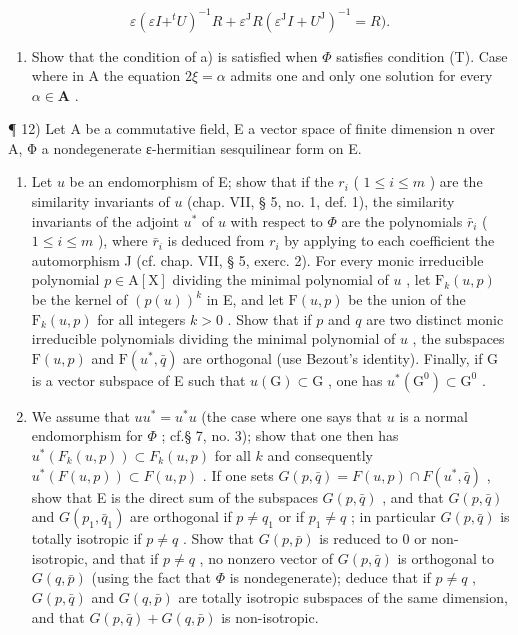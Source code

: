 \[
\varepsilon (\varepsilon I + ^ {t} U) ^ {- 1} R + \varepsilon^ {\mathrm{J}} R (\varepsilon^ {\mathrm{J}} I + U ^ {\mathrm{J}}) ^ {- 1} = R).
\]

\begin{enumerate}
\def\labelenumi{\alph{enumi})}
\setcounter{enumi}{1}
\tightlist
\item
  Show that the condition of a) is satisfied when \(\Phi\) satisfies condition (T). Case where in A the equation \(2\xi = \alpha\) admits one and only one solution for every \(\alpha \in \mathbf{A}\) .
\end{enumerate}

¶ 12) Let A be a commutative field, E a vector space of finite dimension n over A, Φ a nondegenerate ε-hermitian sesquilinear form on E.

\begin{enumerate}
\def\labelenumi{\alph{enumi})}
\item
  Let \(u\) be an endomorphism of E; show that if the \(r_i\) ( \(1 \leqslant i \leqslant m\) ) are the similarity invariants of \(u\) (chap. VII, § 5, no. 1, def. 1), the similarity invariants of the adjoint \(u^*\) of \(u\) with respect to \(\Phi\) are the polynomials \(\bar{r}_i\) ( \(1 \leqslant i \leqslant m\) ), where \(\bar{r}_i\) is deduced from \(r_i\) by applying to each coefficient the automorphism J (cf. chap. VII, § 5, exerc. 2). For every monic irreducible polynomial \(p \in \mathrm{A}[\mathrm{X}]\) dividing the minimal polynomial of \(u\) , let \(\mathrm{F}_k(u, p)\) be the kernel of \((p(u))^k\) in E, and let \(\mathrm{F}(u, p)\) be the union of the \(\mathrm{F}_k(u, p)\) for all integers \(k > 0\) . Show that if \(p\) and \(q\) are two distinct monic irreducible polynomials dividing the minimal polynomial of \(u\) , the subspaces \(\mathrm{F}(u, p)\) and \(\mathrm{F}(u^*, \bar{q})\) are orthogonal (use Bezout's identity). Finally, if G is a vector subspace of E such that \(u(\mathrm{G}) \subset \mathrm{G}\) , one has \(u^*(\mathrm{G}^0) \subset \mathrm{G}^0\) .
\item
  We assume that \(uu^{*} = u^{*}u\) (the case where one says that \(u\) is a normal endomorphism for \(\Phi\) ; cf.§ 7, no. 3); show that one then has \(u^{*}(F_{k}(u,p)) \subset F_{k}(u,p)\) for all \(k\) and consequently \(u^{*}(F(u,p)) \subset F(u,p)\) . If one sets \(G(p,\bar{q}) = F(u,p) \cap F(u^{*},\bar{q})\) , show that E is the direct sum of the subspaces \(G(p,\bar{q})\) , and that \(G(p,\bar{q})\) and \(G(p_{1},\bar{q}_{1})\) are orthogonal if \(p \neq q_{1}\) or if \(p_{1} \neq q\) ; in particular \(G(p,\bar{q})\) is totally isotropic if \(p \neq q\) . Show that \(G(p,\bar{p})\) is reduced to 0 or non-isotropic, and that if \(p \neq q\) , no nonzero vector of \(G(p,\bar{q})\) is orthogonal to \(G(q,\bar{p})\) (using the fact that \(\Phi\) is nondegenerate); deduce that if \(p \neq q\) , \(G(p,\bar{q})\) and \(G(q,\bar{p})\) are totally isotropic subspaces of the same dimension, and that \(G(p,\bar{q}) + G(q,\bar{p})\) is non-isotropic.

\end{enumerate}
